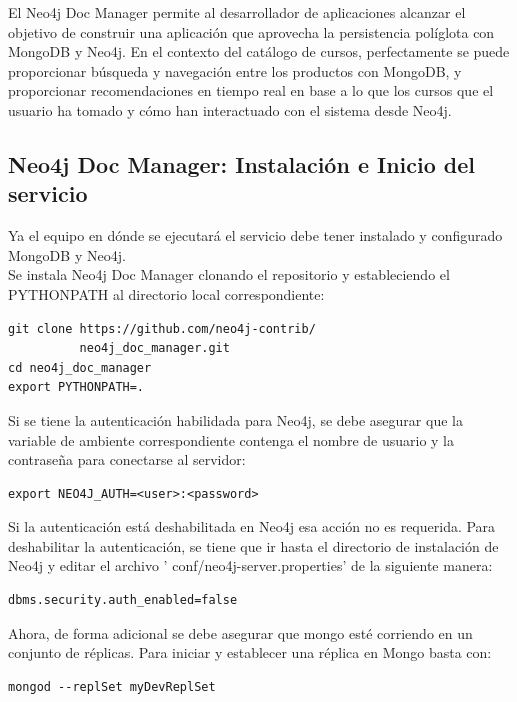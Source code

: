 \documentclass[conference]{IEEEtran}
\begin{document}
El Neo4j Doc Manager permite al desarrollador de aplicaciones alcanzar el objetivo de construir una aplicaci\'on que aprovecha la persistencia pol\'iglota con MongoDB y Neo4j. En el contexto del cat\'alogo de cursos, perfectamente se puede proporcionar b\'usqueda y navegaci\'on entre los productos con MongoDB, y proporcionar recomendaciones en tiempo real en base a lo que los cursos que el usuario ha tomado y c\'omo han interactuado con el sistema desde Neo4j.

\subsection*{Neo4j Doc Manager: Instalaci\'on e Inicio del servicio}

Ya el equipo en d\'onde se ejecutar\'a el servicio debe tener instalado y configurado MongoDB y Neo4j.\\
Se instala Neo4j Doc Manager clonando el repositorio y estableciendo el PYTHONPATH al directorio local correspondiente:

\begin{lstlisting}
git clone https://github.com/neo4j-contrib/
          neo4j_doc_manager.git
cd neo4j_doc_manager
export PYTHONPATH=.
\end{lstlisting}

Si se tiene la autenticaci\'on habilidada para Neo4j, se debe asegurar que la variable de ambiente  correspondiente contenga el nombre de usuario y la contraseña para conectarse al servidor:

\begin{lstlisting}
export NEO4J_AUTH=<user>:<password>
\end{lstlisting}

Si la autenticaci\'on est\'a deshabilitada en Neo4j esa acci\'on no es requerida. Para deshabilitar la autenticación, se tiene que ir hasta el directorio de instalaci\'on de Neo4j y editar el archivo ' conf/neo4j-server.properties'  de la siguiente manera:

\begin{lstlisting}
dbms.security.auth_enabled=false
\end{lstlisting}

Ahora, de forma adicional se debe asegurar que mongo est\'e corriendo en un conjunto de r\'eplicas. Para iniciar y establecer una réplica en Mongo basta con:

\begin{lstlisting}
mongod --replSet myDevReplSet
\end{lstlisting}
\end{document}
